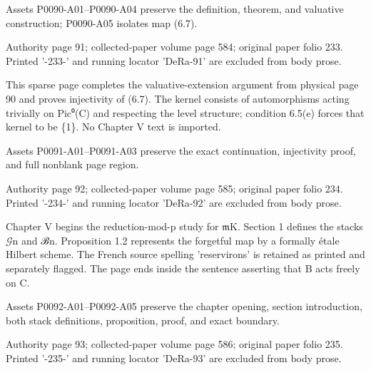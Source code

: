 \documentclass[11pt,a4paper]{article}
\begin{document}
Assets P0090-A01--P0090-A04 preserve the definition, theorem, and valuative construction; P0090-A05 isolates map (6.7).


\par\medskip
\hypertarget{D018-P0091}{}
\par\smallskip
Authority page 91; collected-paper volume page 584; original paper folio 233. Printed '-233-' and running locator 'DeRa-91' are excluded from body prose.

This sparse page completes the valuative-extension argument from physical page 90 and proves injectivity of (6.7). The kernel consists of automorphisms acting trivially on Pic⁰(C) and respecting the level structure; condition 6.5(e) forces that kernel to be \{1\}. No Chapter V text is imported.

Assets P0091-A01--P0091-A03 preserve the exact continuation, injectivity proof, and full nonblank page region.


\par\medskip
\hypertarget{D018-P0092}{}
\par\smallskip
Authority page 92; collected-paper volume page 585; original paper folio 234. Printed '-234-' and running locator 'DeRa-92' are excluded from body prose.

Chapter V begins the reduction-mod-p study for \ensuremath{\mathfrak{m}}\textunderscore{}K. Section 1 defines the stacks \ensuremath{\mathcal{G}}\textunderscore{}n and ℬ\textunderscore{}n. Proposition 1.2 represents the forgetful map by a formally étale Hilbert scheme. The French source spelling 'reservirons' is retained as printed and separately flagged. The page ends inside the sentence asserting that B acts freely on C.

Assets P0092-A01--P0092-A05 preserve the chapter opening, section introduction, both stack definitions, proposition, proof, and exact boundary.


\par\medskip
\hypertarget{D018-P0093}{}
\par\smallskip
Authority page 93; collected-paper volume page 586; original paper folio 235. Printed '-235-' and running locator 'DeRa-93' are excluded from body prose.
\end{document}
